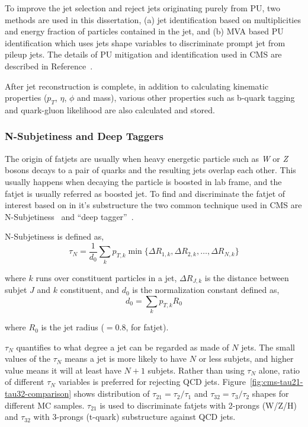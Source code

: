 To improve the jet selection and reject jets originating purely from \gls{PU},
two methods are used in this dissertation, (a) jet identification based on
multiplicities and energy fraction of particles contained in the jet,
and (b) \gls{MVA} based \gls{PU} identification which uses jets shape
variables to discriminate prompt jet from pileup jets.
The details of \gls{PU} mitigation and identification used in
\gls{CMS} are described in Reference~\cite{cms-jme-pu-run2}.

After jet reconstruction is complete, in addition to calculating kinematic
properties (\( p_T \), \( \eta \), \( \phi \) and mass), various other
properties such as b-quark tagging and quark-gluon likelihood are also
calculated and stored.

\subsubsection{
  N-Subjetiness and Deep Taggers
}\label{ch_reco:subjetiness}

The origin of fatjets are usually when heavy energetic particle
such as \textit{W} or \textit{Z} bosons decays to a pair of quarks
and the resulting jets overlap each other. This usually happens
when decaying the particle is boosted in lab frame, and the fatjet
is usually referred as boosted jet.
To find and discriminate the fatjet of interest based on in it's substructure
the two common technique used in \gls{CMS} are N-Subjetiness~\cite{tau21-paper}
and ``deep tagger''~\cite{cms-jme-deep-tagger}.

N-Subjetiness is defined as,
%
\begin{equation}
  \tau_N = \frac{1}{d_0} \sum_k p_{T,k} \min \{ \Delta R_{1,k}, \Delta R_{2,k}, \ldots , \Delta R_{N,k} \}
\end{equation}

where \( k \) runs over constituent particles in a jet, \( \Delta R_{J,k} \)
is the distance between subjet \( J \) and \( k \) constituent, and \( d_0 \)
is the normalization constant defined as,
%
\begin{equation}
  d_0 = \sum_k p_{T,k} R_0
\end{equation}

where \( R_0 \) is the jet radius (\(= 0.8\), for fatjet).

\( \tau_N \) quantifies to what degree a jet can be regarded as made of \( N \) jets.
The small values of the \( \tau_N \) means a jet is more likely to have
\( N \) or less subjets, and higher value means it will at least have \( N + 1\)
subjets. Rather than using \( \tau_N \) alone, ratio of different \( \tau_N \)
variables is preferred for rejecting \gls{QCD} jets.
Figure~\ref{fig:cms-tau21-tau32-comparison} shows distribution of
\( \tau_{21} = \tau_{2}/\tau_{1}\) and \( \tau_{32} = \tau_{3}/\tau_{2}\) shapes
for different \gls{MC} samples.
\( \tau_{21} \) is used to discriminate fatjets with 2-prongs (W/Z/H)
and \( \tau_{32} \) with 3-prongs (t-quark) substructure against QCD jets.

